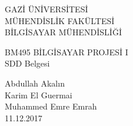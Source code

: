 \renewcommand{\abstractname}{Özet}
\begin{titlepage}
    \begin{center}
        \begin{large}
            \vspace*{0.5cm}
            GAZİ ÜNİVERSİTESİ \\
            MÜHENDİSLİK FAKÜLTESİ \\
            BİLGİSAYAR MÜHENDİSLİĞİ

            \vfill
            BM495 BİLGİSAYAR PROJESİ I \\
            SDD Belgesi
            
            \vfill
            Abdullah Akalın\\Karim El Guermai\\Muhammed Emre Emrah\\

            \vfill
            \vspace{0.5cm}
            11.12.2017
        \end{large}
    \end{center}
\end{titlepage}
